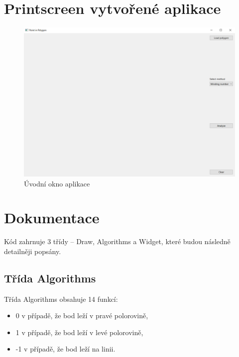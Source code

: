 \documentclass[11pt]{article}
\begin{document}
\clearpage

\section{Printscreen vytvořené aplikace}
\begin{figure}[htbh]
	\centering
	\includegraphics[scale=0.4]{images/aplikace_uvodni_okno.png} 
	\caption{Úvodní okno aplikace}
	\label{fig:uvodni_okno}
\end{figure} 


\section{Dokumentace}
Kód zahrnuje 3 třídy – Draw, Algorithms a Widget, které budou následně detailněji popsány.      

\subsection{Třída Algorithms}
Třída Algorithms obsahuje 14 funkcí:  

\begin{itemize}
	\item 0 v případě, že bod leží v pravé polorovině,
	\item 1 v případě, že  bod leží v levé polorovině,
	\item -1 v případě, že bod leží na linii.
\end{itemize}
\end{document}
